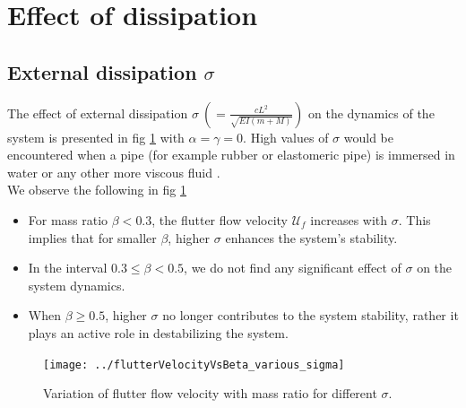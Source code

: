 \documentclass[12pt]{report}
\begin{document}
\section{Effect of dissipation}

\subsection{External dissipation $\sigma$}
The effect of external dissipation $\sigma ~ \left(= \frac{cL^2}{\sqrt{EI (m + M)}} \right)$ on the dynamics of the system is presented in fig \ref{fig:flutter-velocity-vs-beta-various-sigma} with $\alpha = \gamma = 0$. High values of $\sigma$ would be encountered when a pipe (for example rubber or elastomeric pipe) is immersed in water or any other more viscous fluid \cite{paidoussis}. \\
We observe the following in fig \ref{fig:flutter-velocity-vs-beta-various-sigma}
\begin{itemize}
	\item For mass ratio $\beta < 0.3$, the flutter flow velocity $\mathcal{U}_f$ increases with $\sigma$. This implies that for smaller $\beta$, higher $\sigma$ enhances the system's stability.
	
	\item In the interval $0.3 \leq \beta < 0.5$, we do not find any significant effect of $\sigma$ on the system dynamics.
	
	\item When $\beta \geq 0.5$, higher $\sigma$ no longer contributes to the system stability, rather it plays an active role in destabilizing the system.
\end{itemize}


\begin{figure}[h!]
	\centering
	\texttt{[image: ../flutterVelocityVsBeta\_various\_sigma]}
	\caption{Variation of flutter flow velocity with mass ratio for different $\sigma$.}
	\label{fig:flutter-velocity-vs-beta-various-sigma}
\end{figure}
\end{document}
